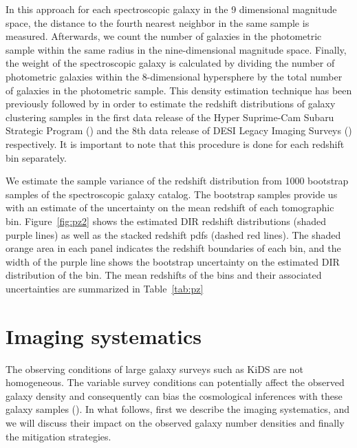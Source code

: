 \documentclass[fleqn,usenatbib,useAMS]{mnras}
\begin{document}
In this approach for each spectroscopic galaxy in the 9 dimensional magnitude space, the distance to the fourth nearest neighbor in the same sample is measured. Afterwards, we count the number of galaxies in the photometric sample within the same radius in the nine-dimensional magnitude space. Finally, the weight of the spectroscopic galaxy is calculated by dividing the number of photometric galaxies within the 8-dimensional hypersphere by the total number of galaxies in the photometric sample. This density estimation technique has been previously followed by \citealt{nicola2019, zhou2020} in order to estimate the redshift distributions of galaxy clustering samples in the first data release of the Hyper Suprime-Cam Subaru Strategic Program (\citealt{hsc_dr1}) and the 8th data release of DESI Legacy Imaging Surveys (\citealt{desi_legacy}) respectively.   
It is important to note that this procedure is done for each redshift bin separately.

We estimate the sample variance of the redshift distribution from 1000 bootstrap samples of the spectroscopic galaxy catalog. The bootstrap samples provide us with an estimate of the uncertainty on the mean redshift of each tomographic bin. Figure~\ref{fig:pz2} shows the estimated DIR redshift distributions (shaded purple lines) as well as the stacked redshift pdfs (dashed red lines). The shaded orange area in each panel indicates the redshift boundaries of each bin, and the width of the purple line shows the bootstrap uncertainty on the estimated DIR distribution of the bin. The mean redshifts of the bins and their associated uncertainties are summarized in Table~\ref{tab:pz}



\section{Imaging systematics}\label{sec:systematic}

The observing conditions of large galaxy surveys such as KiDS are not homogeneous. 
The variable survey conditions can potentially affect the observed galaxy density and consequently can 
bias the cosmological inferences with these galaxy samples (\citealt{ross2012clustering, leistedt2014, leistedt2016mapping, zhai2017clustering, elvin2017, bautista2018sdss, crocce2019dark, DESI_systematic, rezaie2019, icaza2020clustering}). In what follows, first we describe the imaging systematics, and we will discuss their impact on the observed galaxy number densities and finally the mitigation strategies. 
\end{document}
